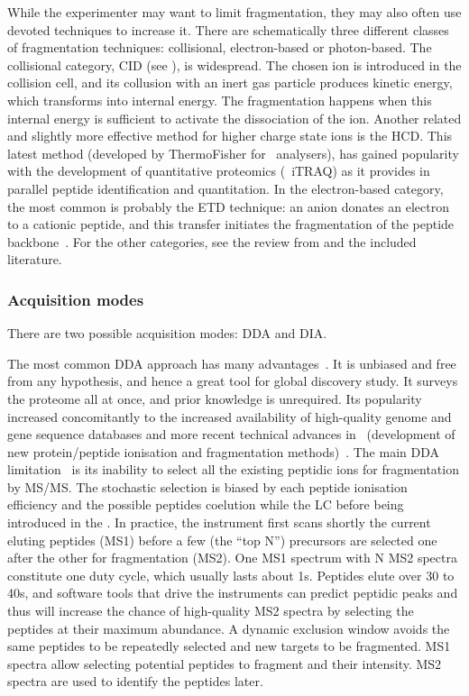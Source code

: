 While the experimenter may want to limit fragmentation,
they may also often use devoted techniques to increase it.
There are schematically three different classes of fragmentation techniques:
collisional, electron-based or photon-based.
The collisional category, \gls{CID} (see ),
is widespread.
The chosen ion is introduced in the collision cell,
and its collusion with an inert gas particle produces kinetic energy,
which transforms into internal energy.
The fragmentation happens when this internal energy is sufficient to activate
the dissociation of the ion.
Another related and slightly more effective method
for higher charge state ions is the \acrfull{HCD}.
This latest method (developed by ThermoFisher for \orbi\ analysers),
has gained popularity with the development of quantitative proteomics
(\eg\ \gls{iTRAQ})
as it provides in parallel peptide identification and quantitation.
In the electron-based category,
the most common is probably the \acrfull{ETD} technique:
an anion donates an electron to a cationic peptide,
and this transfer initiates
the fragmentation of the peptide backbone~.
For the other categories,
see the review from \citet{Zhang2014} and the included literature.

\subsubsection{Acquisition modes}
There are two possible acquisition modes: \gls{DDA} and \gls{DIA}.

The most common \gls{DDA} approach has many advantages~.
It is unbiased and free from any hypothesis,
and hence a great tool for global discovery study.
It surveys the proteome all at once,
and prior knowledge is unrequired.
Its popularity increased concomitantly to the increased availability of
high-quality genome and gene sequence databases
and more recent technical advances in \ms\
(development of new protein/peptide ionisation
and fragmentation methods)~.
The main \gls{DDA} limitation~\mycite{Guillaumot2017-ba} is its inability
to select all the existing peptidic ions for fragmentation by \gls{MS/MS}.
The stochastic selection is biased by
each peptide ionisation efficiency
and the possible peptides coelution
while the \gls{LC} before being introduced in the \ms.
In practice, the instrument first scans shortly the current eluting peptides (MS1)
before a few (the ``top N'') precursors are selected
one after the other for fragmentation (MS2).
One MS1 spectrum with N MS2 spectra constitute one duty cycle,
which usually lasts about 1s.
Peptides elute over 30 to 40s,
and software tools that drive the instruments can predict peptidic peaks
and thus will increase the chance of high-quality MS2 spectra
by selecting the peptides at their maximum abundance.
A dynamic exclusion window avoids the same peptides to be repeatedly selected and
new targets to be fragmented.
MS1 spectra allow selecting potential peptides to fragment and their intensity.
MS2 spectra are used to identify the peptides later.

